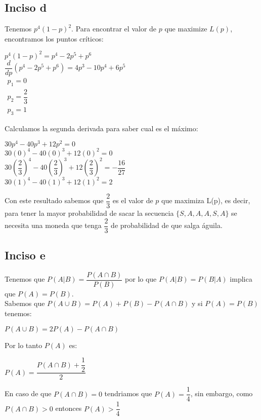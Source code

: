 \documentclass[11pt]{article}
\begin{document}
\subsection{Inciso d}
Tenemos $p^{4}\left( 1-p\right) ^{2}$. Para encontrar el valor de $p$ que maximize $L(p)$, encontramos los puntos críticos:\begin{center}
$p ^{4}\left( 1-p\right) ^{2}=p^{4}-2p^{5}+p^{6}$\\
$\dfrac{d}{d p }\left( p^{4}-2p ^{5}+p^{6}\right) =4p ^{3}-10p ^{4}+6p ^{5}$\\
$\begin{aligned}p _{1}=0\\ p _{2}=\dfrac{2}{3}\\ p_{3}=1\end{aligned}$
\end{center}
Calculamos la segunda derivada para saber cual es el máximo:
\begin{center}
$30p^{4}-40p^{3}+12p ^{2}=0$\\
$30(0)^{4}-40(0)^{3}+12(0) ^{2}=0$\\
$30(\dfrac{2}{3})^{4}-40(\dfrac{2}{3})^{3}+12(\dfrac{2}{3}) ^{2}=-\dfrac{16}{27}$\\
$30(1)^{4}-40(1)^{3}+12(1) ^{2}=2$\\
\end{center}
Con este resultado sabemos que $\dfrac{2}{3}$ es el valor de $p$ que maximiza L(p), es decir, para tener la mayor probabilidad de sacar la secuencia $\{S, A, A, A, S, A\}$ se necesita una moneda que tenga $\dfrac{2}{3}$ de probabilidad de que salga águila. \pagebreak
\subsection{Inciso e}
Tenemos que $P\left( A| B\right) =\dfrac{P\left( A\cap B\right) }{P\left( B\right) }$ por lo que $P\left( A| B\right) = P\left(B| A\right)$ implica que $P(A) = P(B)$.\\
Sabemos que $P\left( A\cup B\right) =P\left( A\right) +P\left( B\right) -P\left( A\cap B\right)$ y si $P(A) = P(B)$ tenemos:
\begin{center}
$P\left( A\cup B\right) =2P\left( A\right)  -P\left( A\cap B\right)$
\end{center}
Por lo tanto $P(A)$ es: \begin{center}
$P\left( A\right) =\dfrac{P\left( A\cap B\right) +\dfrac{1}{2}}{2}$
\end{center}
En caso de que $P(A\cap B) = 0$ tendriamos que $P(A) = \dfrac{1}{4}$, sin embargo, como $P(A\cap B) > 0$ entonces $P(A) > \dfrac{1}{4}$
\end{document}

